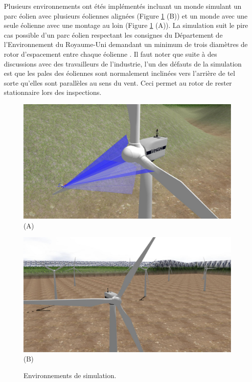 Plusieurs environnements ont étés implémentés incluant un monde simulant un parc éolien avec plusieurs éoliennes alignées (Figure \ref{fig:sim_worlds} (B)) et un monde avec une seule éolienne avec une montage au loin (Figure \ref{fig:sim_worlds} (A)). La simulation suit le pire cas possible d'un parc éolien respectant les consignes du Département de l'Environnement du Royaume-Uni demandant un minimum de trois diamètres de rotor d'espacement entre chaque éolienne \citep{DOE2009}. Il faut noter que suite à des discussions avec des travailleurs de l'industrie, l'un des défauts de la simulation est que les pales des éoliennes sont normalement inclinées vers l'arrière de tel sorte qu'elles sont parallèles au sens du vent. Ceci permet au rotor de rester stationnaire lors des inspections.

\begin{figure}[htp]
  \centering
  \begin{minipage}{0.49\textwidth}
    \centering
    \includegraphics[width=\linewidth]{images/sim_vestas_closeup.jpg}
    (A)
  \end{minipage}
  \begin{minipage}{0.49\textwidth}
    \centering
    \includegraphics[width=\linewidth]{images/sim_vestas_multiple.jpg}
    (B)
  \end{minipage}
  \caption{Environnements de simulation.}
  \label{fig:sim_worlds}
\end{figure}

